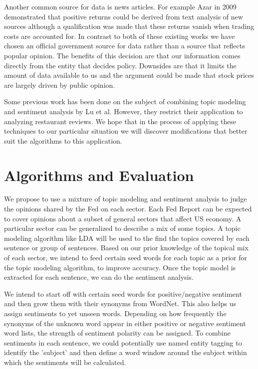 \documentclass{sig-alternate-05-2015}
\begin{document}
Another common source for data is news articles. For example
Azar in 2009 demonstrated that positive returns could be derived
from text analysis of new sources although a qualification was made
that these returns vanish when trading costs are accounted for.\cite{azar:thesis} In 
contrast to both of these existing works we have chosen an official
government source for data rather than a source that reflects popular opinion.
The benefits of this decision are that our information comes directly from the
entity that decides policy. Downsides are that it limits the amount of data 
available to us and the argument could be made that stock prices are largely
driven by public opinion.

Some previous work has been done on the subject of combining topic modeling and
sentiment analysis by Lu et al.\cite{lu:2011} However, they restrict their application to analyzing
restaurant reviews. We hope that in the process of applying these techniques to our
particular situation we will discover modifications that better suit the algorithms
to this application.
\vfill

\section{Algorithms and Evaluation}
We propose to use a mixture of topic modeling and sentiment analysis to judge the opinions shared by the Fed on each sector. Each Fed Report can be expected to cover opinions about a subset of  general sectors that affect US economy. A particular sector can be generalized to describe a  mix of some topics.  A topic modeling algorithm like LDA\cite{blei:lda} will be used to  the find the topics covered by each sentence or group of sentences. Based on our prior knowledge of the topical mix of each sector, we intend to feed certain seed words for each topic as a  prior for the topic modeling algorithm, to improve accuracy. Once the topic model is extracted for each sentence, we can do the sentiment analysis.
 
We intend to start off with certain seed words for positive/negative sentiment and then grow them with their synonyms from WordNet\cite{kim:dso}. This  also helps us assign sentiments to yet unseen words. Depending on how frequently the synonyms of the unknown word appear in either positive or negative sentiment word lists, the strength of sentiment polarity can be assigned. To combine sentiments in each sentence, we could potentially use named entity tagging to identify the 'subject' and then define a word window around the subject within which the sentiments will be calculated.
\end{document}
